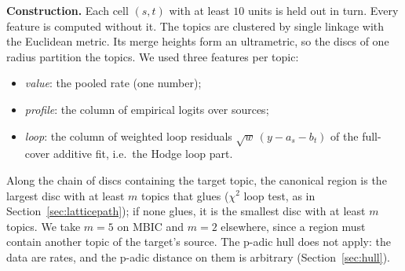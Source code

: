 \documentclass[11pt]{article}
\theoremstyle{definition}
\theoremstyle{remark}
\begin{document}
\textbf{Construction.} Each cell $(s,t)$ with at least $10$ units is held out in turn. Every feature is computed without it. The topics are clustered by single linkage with the Euclidean metric. Its merge heights form an ultrametric, so the discs of one radius partition the topics. We used three features per topic:
\begin{itemize}
  \item \emph{value}: the pooled rate (one number);
  \item \emph{profile}: the column of empirical logits over sources;
  \item \emph{loop}: the column of weighted loop residuals $\sqrt{w}\,(y-a_s-b_t)$ of the full-cover additive fit, i.e.\ the Hodge loop part.
\end{itemize}
Along the chain of discs containing the target topic, the canonical region is the largest disc with at least $m$ topics that glues ($\chi^2$ loop test, as in Section~\ref{sec:latticepath}); if none glues, it is the smallest disc with at least $m$ topics. We take $m=5$ on MBIC and $m=2$ elsewhere, since a region must contain another topic of the target's source. The p-adic hull does not apply: the data are rates, and the p-adic distance on them is arbitrary (Section~\ref{sec:hull}).

\begin{table}[!htbp]\centering\small
\caption{Hull covers against the full cover and against models of the loop (mean $|\hat p-\text{truth}|$ over held-out cells). ``Sub'' is the number of targets for which the hull chose a proper sub-region. ``Chain'' is the median spread of $\hat p$ along the hull's discs, and ``lattice'' the median spread over all glueable regions. The oracle picks the best glueable region using the truth. The last two model columns fit the loop: rank-1 interaction $a_s+b_t+u_sv_t$, and tropical rank~2 ($\min$ or $\max$ of two additive regimes, i.e.\ columns on a tropical line, which is a tree). Both are fitted by alternating closed-form weighted least squares. In brackets: the number of targets beaten against the full cover.}\label{tab:hullcover}
\end{table}
\end{document}
